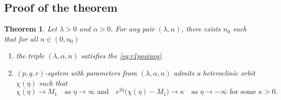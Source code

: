 \documentclass[a4paper,11pt]{article}
\newtheorem{theorem}{Theorem}
\begin{document}
\pagebreak


\subsection{Proof of the theorem} \label{sec:proof_proof}

\begin{theorem} \label{thm1}
Let $\lambda>0$ and $\alpha>0$. For any pair $(\lambda,\alpha)$, there exists $n_0$ such that for all $n \in (0,n_0)$
\begin{enumerate}
    \item[(i)] the triple $(\lambda,\alpha,n)$ satisfies the \eqref{eq:r1posineq}.
    \item[(ii)] $(p,q,r)$-system with parameters from $(\lambda,\alpha,n)$ admits a heteroclinic orbit $\chi(\eta)$ such that
    \begin{equation} \label{eq:estimate}
        \chi(\eta) \rightarrow M_1 \quad \text{as $\eta \rightarrow \infty$ and} \quad e^{2\eta}\big(\chi(\eta) - M_1\big) \rightarrow \kappa \quad \text{as $\eta \rightarrow -\infty$ for some $\kappa>0$}.
    \end{equation}
\end{enumerate}
\end{theorem}
\end{document}
